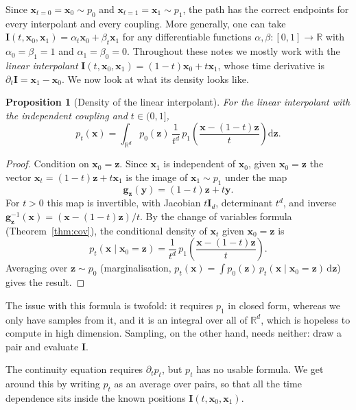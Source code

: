 \documentclass[11pt,a4paper]{article}
\numberwithin{equation}{section}     %
\theoremstyle{plain}        %
\newtheorem{proposition}[theorem]{Proposition}
\theoremstyle{definition}   %
\theoremstyle{remark}       %
\begin{document}
Since $\mathbf{x}_{t=0}=\mathbf{x}_0\sim p_0$ and $\mathbf{x}_{t=1}=\mathbf{x}_1\sim p_1$, the path has the correct endpoints for every interpolant and every coupling. More generally, one can take $\mathbf{I}(t,\mathbf{x}_0,\mathbf{x}_1)=\alpha_t\mathbf{x}_0+\beta_t\mathbf{x}_1$ for any differentiable functions $\alpha,\beta:[0,1]\to\mathbb{R}$ with $\alpha_0=\beta_1=1$ and $\alpha_1=\beta_0=0$. Throughout these notes we mostly work with the \emph{linear interpolant} \citep{liu2023,lipman2023} $\mathbf{I}(t,\mathbf{x}_0,\mathbf{x}_1)=(1-t)\mathbf{x}_0+t\mathbf{x}_1$, whose time derivative is $\partial_t\mathbf{I}=\mathbf{x}_1-\mathbf{x}_0$. We now look at what its density looks like.

\begin{proposition}[Density of the linear interpolant]\label{prop:lineardensity}
For the linear interpolant with the independent coupling and $t\in(0,1]$,
\[
p_t(\mathbf{x})=\int_{\mathbb{R}^d}p_0(\mathbf{z})\,\frac{1}{t^d}\,p_1\left(\frac{\mathbf{x}-(1-t)\mathbf{z}}{t}\right)\mathrm{d}\mathbf{z} .
\]
\end{proposition}

\begin{proof}
Condition on $\mathbf{x}_0=\mathbf{z}$. Since $\mathbf{x}_1$ is independent of $\mathbf{x}_0$, given $\mathbf{x}_0=\mathbf{z}$ the vector $\mathbf{x}_t=(1-t)\mathbf{z}+t\mathbf{x}_1$ is the image of $\mathbf{x}_1\sim p_1$ under the map
\[
\mathbf{g}_{\mathbf{z}}(\mathbf{y})=(1-t)\mathbf{z}+t\mathbf{y}.
\]
For $t>0$ this map is invertible, with Jacobian $t\mathbf{I}_d$, determinant $t^d$, and inverse $\mathbf{g}_{\mathbf{z}}^{-1}(\mathbf{x})=(\mathbf{x}-(1-t)\mathbf{z})/t$. By the change of variables formula (Theorem~\ref{thm:cov}), the conditional density of $\mathbf{x}_t$ given $\mathbf{x}_0=\mathbf{z}$ is
\[
p_t(\mathbf{x}\mid\mathbf{x}_0=\mathbf{z})=\frac{1}{t^d}\,p_1\left(\frac{\mathbf{x}-(1-t)\mathbf{z}}{t}\right).
\]
Averaging over $\mathbf{z}\sim p_0$ (marginalisation, $p_t(\mathbf{x})=\int p_0(\mathbf{z})\,p_t(\mathbf{x}\mid\mathbf{x}_0=\mathbf{z})\,\mathrm{d}\mathbf{z}$) gives the result.
\end{proof}

The issue with this formula is twofold: it requires $p_1$ in closed form, whereas we only have samples from it, and it is an integral over all of $\mathbb{R}^d$, which is hopeless to compute in high dimension. Sampling, on the other hand, needs neither: draw a pair and evaluate $\mathbf{I}$.

The continuity equation requires $\partial_t p_t$, but $p_t$ has no usable formula. We get around this by writing $p_t$ as an average over pairs, so that all the time dependence sits inside the known positions $\mathbf{I}(t,\mathbf{x}_0,\mathbf{x}_1)$.
\end{document}

